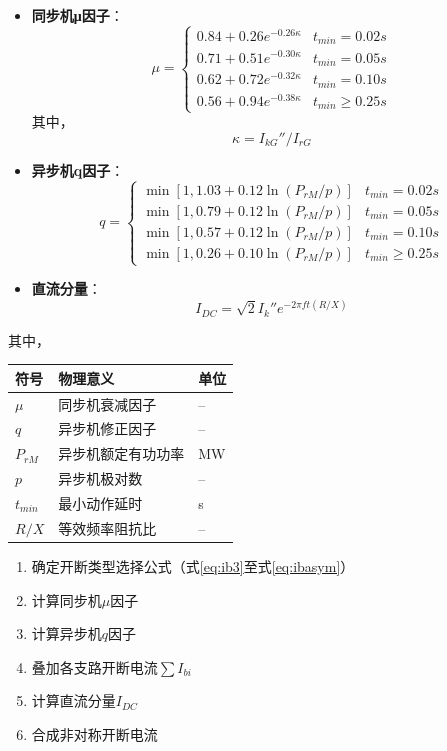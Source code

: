 \documentclass[a4paper,11pt,AutoFakeBold]{ctexart}
\begin{document}
\begin{itemize}
\item \textbf{同步机μ因子}：
  \[
  \mu = 
  \begin{cases}
  0.84 + 0.26e^{-0.26\kappa} & t_{min}=0.02\si{s} \\
  0.71 + 0.51e^{-0.30\kappa} & t_{min}=0.05\si{s} \\
  0.62 + 0.72e^{-0.32\kappa} & t_{min}=0.10\si{s} \\
  0.56 + 0.94e^{-0.38\kappa} & t_{min}\geq0.25\si{s}
  \end{cases}
  \]
  其中，\[ \kappa = I_{kG}''/I_{rG} \]

\item \textbf{异步机q因子}：
  \[
  q = 
  \begin{cases}
  \min[1,1.03 + 0.12\ln(P_{rM}/p)] & t_{min}=0.02\si{s} \\
  \min[1,0.79 + 0.12\ln(P_{rM}/p)] & t_{min}=0.05\si{s} \\
  \min[1,0.57 + 0.12\ln(P_{rM}/p)] & t_{min}=0.10\si{s} \\
  \min[1,0.26 + 0.10\ln(P_{rM}/p)] & t_{min}\geq0.25\si{s}
  \end{cases}
  \]

\item \textbf{直流分量}：
  \[
  I_{DC} = \sqrt{2}I_k''e^{-2\pi f t (R/X)}
  \]
\end{itemize}

其中， 

\begin{tabular}{lll}
符号 & 物理意义 & 单位 \\
\hline
$\mu$ & 同步机衰减因子 & -- \\
$q$ & 异步机修正因子 & -- \\
$P_{rM}$ & 异步机额定有功功率 & \si{MW} \\
$p$ & 异步机极对数 & -- \\
$t_{min}$ & 最小动作延时 & \si{s} \\
$R/X$ & 等效频率阻抗比 & -- \\
\end{tabular}

\begin{enumerate}
\item 确定开断类型选择公式（式\ref{eq:ib3}至式\ref{eq:ibasym}）
\item 计算同步机$\mu$因子
\item 计算异步机$q$因子
\item 叠加各支路开断电流$\sum I_{bi}$
\item 计算直流分量$I_{DC}$
\item 合成非对称开断电流
\end{enumerate}
\end{document}
